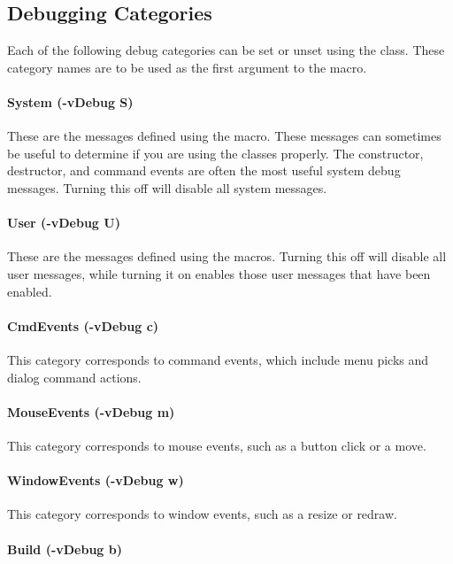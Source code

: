 \subsection*{Debugging Categories}

Each of the following debug categories can be set or unset using
the  class. These category names are to be
used as the first argument to the  macro.

\paragraph*{System (-vDebug S)}

These are the messages defined using the  macro.
These messages can sometimes be useful to determine if you are
using the classes properly. The constructor, destructor, and
command events are often the most useful system debug messages.
Turning this off will disable all system messages.

\paragraph*{User (-vDebug U)}

These are the messages defined using the  macros. Turning
this off will disable all user messages, while turning it on enables those
user messages that have been enabled.

\paragraph*{CmdEvents (-vDebug c)}

This category corresponds to command events, which include menu
picks and dialog command actions.

\paragraph*{MouseEvents (-vDebug m)}

This category corresponds to mouse events, such as a button click
or a move.

\paragraph*{WindowEvents (-vDebug w)}

This category corresponds to window events, such as a resize or redraw.

\paragraph*{Build (-vDebug b)}


